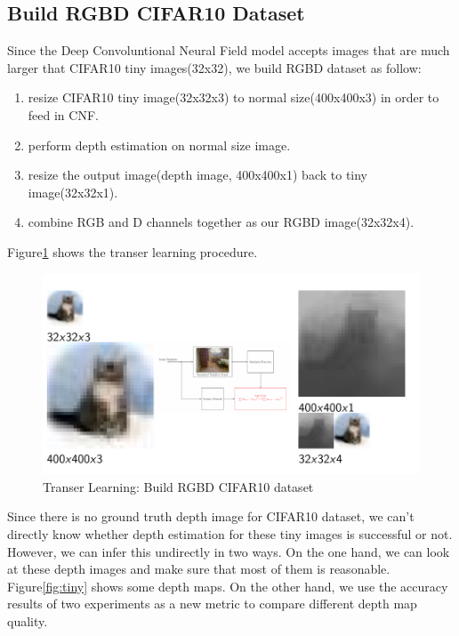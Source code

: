 \documentclass[10pt,twocolumn,letterpaper]{article}
\begin{document}
\subsection{Build RGBD CIFAR10 Dataset}
Since the Deep Convoluntional Neural Field model accepts images that are 
much larger that CIFAR10 tiny images(32x32), we build RGBD dataset as follow:
\begin{enumerate}
\item resize CIFAR10 tiny image(32x32x3) to normal size(400x400x3) in order to 
feed in CNF.
\item perform depth estimation on normal size image.
\item resize the output image(depth image, 400x400x1) back to tiny 
image(32x32x1).
\item combine RGB and D channels together as our RGBD image(32x32x4).
\end{enumerate}
Figure\ref{fig:dataset} shows the transer learning procedure.
\begin{figure}
\includegraphics[width=\linewidth]{../dataset.png}
\caption{Transer Learning: Build RGBD CIFAR10 dataset}
\label{fig:dataset}
\end{figure}
Since there is no ground truth depth image for CIFAR10 dataset, we can\rq{}t directly 
know whether depth estimation for these tiny images is successful or not. 
However, we can infer this undirectly in two ways. 
On the one hand, we can look at these depth images
and make sure that most of them is reasonable.
Figure\ref{fig:tiny} shows some depth maps.
On the other hand, we use the accuracy results of two experiments as a new metric to 
compare different depth map quality.
\end{document}
